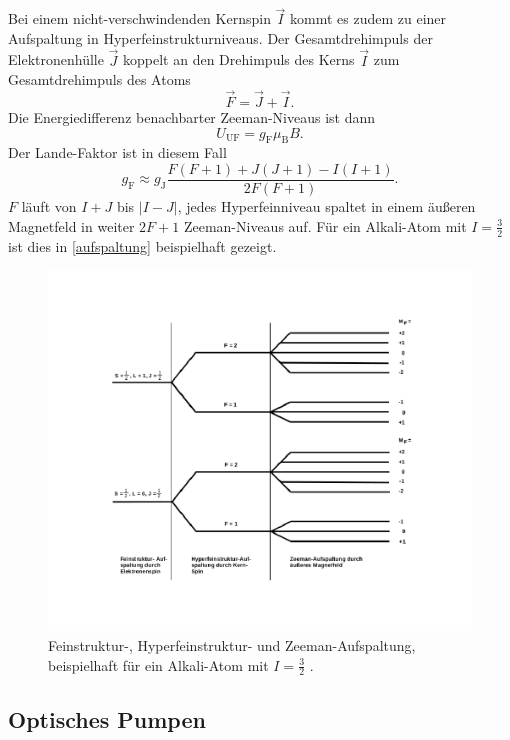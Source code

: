 Bei einem nicht-verschwindenden Kernspin $\vec{I}$ kommt es zudem zu einer Aufspaltung in Hyperfeinstrukturniveaus.
Der Gesamtdrehimpuls der Elektronenhülle $\vec{J}$ koppelt an den Drehimpuls des Kerns $\vec{I}$ zum Gesamtdrehimpuls des Atoms
\begin{equation}
  \vec{F} = \vec{J} + \vec{I}.
\end{equation}
Die Energiedifferenz benachbarter Zeeman-Niveaus ist dann
\begin{equation}
  U_\text{UF} = g_\text{F}\mu_\text{B}B.
\end{equation}
Der Lande-Faktor ist in diesem Fall
\begin{equation}
  g_\text{F} \approx g_\text{J}\frac{F(F+1)+J(J+1)-I(I+1)}{2F(F+1)}.
  \label{eq:g}
\end{equation}
$F$ läuft von $I+J$ bis $|I-J|$, jedes Hyperfeinniveau spaltet in einem äußeren Magnetfeld in weiter $2F+1$ Zeeman-Niveaus
auf. Für ein Alkali-Atom mit $I=\frac{3}{2}$ ist dies in \autoref{aufspaltung} beispielhaft gezeigt.
\begin{figure}
  \centering
  \includegraphics[width=\textwidth]{img/aufspaltung.pdf}
  \caption{Feinstruktur-, Hyperfeinstruktur- und Zeeman-Aufspaltung, beispielhaft für ein Alkali-Atom mit
  $I=\frac{3}{2}$ \cite{FP}.}
  \label{aufspaltung}
\end{figure}

\subsection{Optisches Pumpen}

